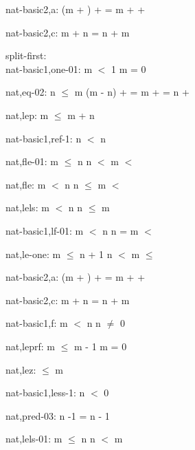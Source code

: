 \documentclass[a4paper]{article}
\begin{document}
nat-basic2,a: 
 \Fol (m + ) +  = m +  + 



nat-basic2,c: 
 \Fol m + n = n + m



\bigskip

split-first:\\ nat-basic1,one-01: 
 \Fol m $<$ 1 \Equiv m = 0



nat,eq-02: 
n $\le$ m
 \Fol (m - n) +  =  \Equiv m +  = n + 



nat,lep: 
 \Fol m $\le$ m + n



nat-basic1,ref-1: 
 \Fol \Not n $<$ n



nat,fle-01: 
 \Fol m $\le$ n \And n $<$  \Imp m $<$ 



nat,fle: 
 \Fol m $<$ n \And n $\le$  \Imp m $<$ 



nat,lels: 
 \Fol \Not m $<$ n \Equiv n $\le$ m



nat-basic1,lf-01: 
 \Fol m $<$ n \And n =  \Imp m $<$ 



nat,le-one: 
 \Fol m $\le$ n + 1 \And n $<$  \Imp m $\le$ 



nat-basic2,a: 
 \Fol (m + ) +  = m +  + 



nat-basic2,c: 
 \Fol m + n = n + m



nat-basic1,f: 
 \Fol m $<$ n \Imp n $\neq$ 0



nat,leprf: 
 \Fol m $\le$ m - 1 \Imp m = 0



nat,lez: 
  $\le$ m



nat-basic1,less-1: 
 \Fol \Not n $<$ 0



nat,pred-03: 
 \Fol n -1 = n - 1



nat,lels-01: 
 \Fol \Not m $\le$ n \Equiv n $<$ m
\end{document}
